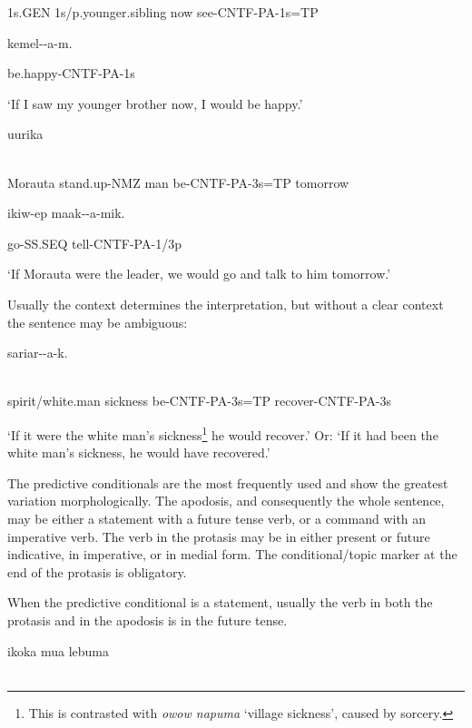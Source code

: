 1s.GEN  1s/p.younger.sibling  now  see-CNTF-PA-1s=TP

kemel--a-m.

be.happy-CNTF-PA-1s

`If I saw my younger brother now, I would be happy.'

\ea%
\label{ex:x1647}
\gll [Morauta  iimar-ow(a)  mua  ik-\textstyleEmphasizedVernacularWords{ek}-a-k=\textstyleEmphasizedVernacularWords{na},]  uurika \\
      \\
\glt
\z

Morauta  stand.up-NMZ  man  be-CNTF-PA-3s=TP  tomorrow

ikiw-ep  maak--a-mik.

go-SS.SEQ  tell-CNTF-PA-1/3p

`If Morauta were the leader, we would go and talk to him tomorrow.'

Usually the context determines the interpretation, but without a clear context the sentence may be ambiguous:  

\ea%
\label{ex:x1648}
\gll [Inasin  napuma  ik-\textstyleEmphasizedVernacularWords{ek}-a-k=\textstyleEmphasizedVernacularWords{na}]  sariar--a-k. \\
      \\
\glt
\z

spirit/white.man  sickness  be-CNTF-PA-3s=TP  recover-CNTF-PA-3s

`If it were the white man's sickness\footnote{This is contrasted with \textit{owow napuma} `village sickness', caused by sorcery.} he would recover.' Or: `If it had been the white man's sickness, he would have recovered.'

The predictive conditionals are the most frequently used and show the greatest variation morphologically. The apodosis, and consequently the whole sentence, may be either a statement with a future tense verb, or a command with an imperative verb. The verb in the protasis may be in either present or future indicative, in imperative, or in medial form. The conditional/topic marker at the end of the protasis is obligatory. 

When the predictive conditional is a statement, usually the verb in both the protasis and in the apodosis is in the future tense.

\ea%
\label{ex:x1652}
\gll [No  oram  mokok=iw  \textstyleEmphasizedVernacularWords{ika-i-nan=na}]  ikoka  mua  lebuma \\
      \\
\glt
\z

